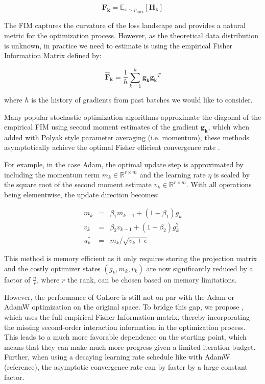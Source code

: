 \[
\mathbf{F_{k}} = \mathbb{E}_{x \sim p_{\text{data}}} \left[ \mathbf{H_{k}} \right]
\]

The FIM captures the curvature of the loss landscape and provides a natural metric for the optimization process. However, as the theoretical data distribution is unknown, in practice we need to estimate is using the empirical Fisher Information Matrix \citep{martensNewPerspectiveNatural2014} defined by:

\[
\mathbf{\hat{F}_{k}} = \frac{1}{h} \sum_{k=1}^{h} \mathbf{g_{k}} \mathbf{g_{k}}^{T}
\]

where \(h\) is the history of gradients from past batches we would like to consider.

Many popular stochastic optimization algorithms approximate the diagonal of the empirical FIM using second moment estimates of the gradient \(\mathbf{g_{k}}\), which when added with Polyak style parameter averaging (i.e. momentum), these methods asymptotically achieve the optimal Fisher efficient convergence rate \citep{martens2020new}.

For example, in the case Adam, the optimal update step is approximated by including the momentum term \(m_{k} \in \mathbb{R}^{r\times m}\) and the learning rate \(\eta\) is scaled by the square root of the second moment estimate \(v_{k} \in \mathbb{R}^{r\times m}\). With all operations being elementwise, the update direction becomes:

\begin{eqnarray}
    m_{k} &=& \beta_{1} m_{k-1} + (1-\beta_{1}) g_{k} \\
    v_{k} &=& \beta_{2} v_{k-1} + (1-\beta_2) g^{2}_{k}  \\
    u^*_{k} &=& m_{k} / \sqrt{v_{k} + \epsilon}
\end{eqnarray}

This method is memory efficient as it only requires storing the projection matrix and the costly optimizer states \(\left(g_{k}, m_{k}, v_{k}\right)\) are now significantly reduced by a factor of \(\frac{n}{r}\), where \(r\) the rank, can be chosen based on memory limitations.

% 

However, the performance of GaLore is still not on par with the Adam or AdamW optimization on the original space. To bridge this gap, we propose \lowrank, which uses the full empirical Fisher Information matrix, thereby incorporating the missing second-order interaction information in the optimization process. This leads to a much more favorable dependence on the starting point, which means that they can make much more progress given a limited iteration budget. Further, when using a decaying learning rate schedule like with AdamW (reference), the asymptotic convergence rate can by faster by a large constant factor.

